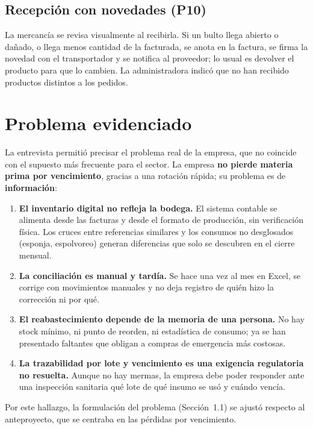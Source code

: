 \subsection{Recepción con novedades (P10)}

La mercancía se revisa visualmente al recibirla. Si un bulto llega abierto o dañado, o llega menos cantidad de la facturada, se anota en la factura, se firma la novedad con el transportador y se notifica al proveedor; lo usual es devolver el producto para que lo cambien. La administradora indicó que no han recibido productos distintos a los pedidos.

\section{Problema evidenciado}
\label{sec:req_problema}

La entrevista permitió precisar el problema real de la empresa, que no coincide con el supuesto más frecuente para el sector. La empresa \textbf{no pierde materia prima por vencimiento}, gracias a una rotación rápida; su problema es de \textbf{información}:

\begin{enumerate}
    \item \textbf{El inventario digital no refleja la bodega.} El sistema contable se alimenta desde las facturas y desde el formato de producción, sin verificación física. Los cruces entre referencias similares y los consumos no desglosados (esponja, espolvoreo) generan diferencias que solo se descubren en el cierre mensual.
    \item \textbf{La conciliación es manual y tardía.} Se hace una vez al mes en Excel, se corrige con movimientos manuales y no deja registro de quién hizo la corrección ni por qué.
    \item \textbf{El reabastecimiento depende de la memoria de una persona.} No hay stock mínimo, ni punto de reorden, ni estadística de consumo; ya se han presentado faltantes que obligan a compras de emergencia más costosas.
    \item \textbf{La trazabilidad por lote y vencimiento es una exigencia regulatoria no resuelta.} Aunque no hay mermas, la empresa debe poder responder ante una inspección sanitaria qué lote de qué insumo se usó y cuándo vencía.
\end{enumerate}

Por este hallazgo, la formulación del problema (Sección~1.1) se ajustó respecto al anteproyecto, que se centraba en las pérdidas por vencimiento.

